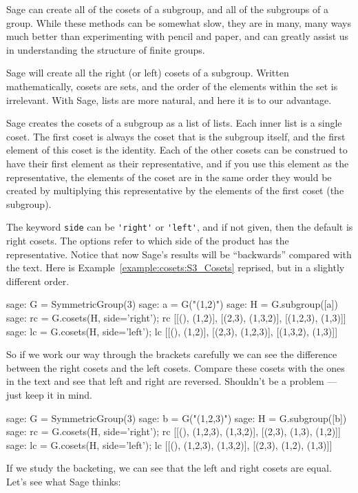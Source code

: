 Sage can create all of the cosets of a subgroup, and all of the subgroups of a group.  While these methods can be somewhat slow, they are in many, many ways much better than experimenting with pencil and paper, and can greatly assist us in understanding the structure of finite groups.\par
%
%
Sage will create all the right (or left) cosets of a subgroup.  Written mathematically, cosets are sets, and the order of the elements within the set is irrelevant.  With Sage, lists are more natural, and here it is to our advantage.\par
%
Sage creates the cosets of a subgroup as a list of lists.  Each inner list is a single coset.  The first coset is always the coset that is the subgroup itself, and the first element of this coset is the identity.  Each of the other cosets can be construed to have their first element as their representative, and if you use this element as the representative, the elements of the coset are in the same order they would be created by multiplying this representative by the elements of the first coset (the subgroup).\par
%
The keyword \verb?side? can be \verb?'right'? or \verb?'left'?, and if not given, then the default is right cosets.  The options refer to which side of the product has the representative.  Notice that now Sage's results will be ``backwards'' compared with the text.  Here is Example~\ref{example:cosets:S3_Cosets} reprised, but in a slightly different order.
%
\begin{sageexample}
sage: G = SymmetricGroup(3)
sage: a = G("(1,2)")
sage: H = G.subgroup([a])
sage: rc = G.cosets(H, side='right'); rc
[[(), (1,2)], [(2,3), (1,3,2)], [(1,2,3), (1,3)]]
sage: lc = G.cosets(H, side='left'); lc
[[(), (1,2)], [(2,3), (1,2,3)], [(1,3,2), (1,3)]]
\end{sageexample}
%
So if we work our way through the brackets carefully we can see the difference between the right cosets and the left cosets.  Compare these cosets with the ones in the text and see that left and right are reversed.  Shouldn't be a problem --- just keep it in mind.
%
\begin{sageexample}
sage: G = SymmetricGroup(3)
sage: b = G("(1,2,3)")
sage: H = G.subgroup([b])
sage: rc = G.cosets(H, side='right'); rc
[[(), (1,2,3), (1,3,2)], [(2,3), (1,3), (1,2)]]
sage: lc = G.cosets(H, side='left'); lc
[[(), (1,2,3), (1,3,2)], [(2,3), (1,2), (1,3)]]
\end{sageexample}
%
If we study the backeting, we can see that the left and right cosets are equal.  Let's see what Sage thinks:
